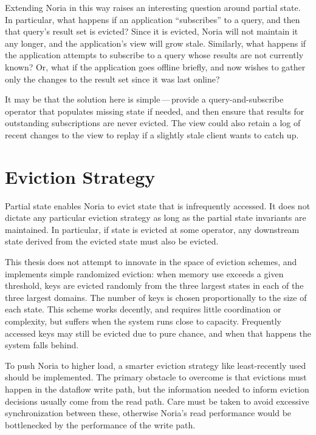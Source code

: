 Extending Noria in this way raises an interesting question around partial state.
In particular, what happens if an application ``subscribes'' to a query, and
then that query's result set is evicted? Since it is evicted, Noria will not
maintain it any longer, and the application's view will grow stale. Similarly,
what happens if the application attempts to subscribe to a query whose results
are not currently known? Or, what if the application goes offline briefly, and
now wishes to gather only the changes to the result set since it was last
online?

It may be that the solution here is simple\,---\,provide a query-and-subscribe
operator that populates missing state if needed, and then ensure that results
for outstanding subscriptions are never evicted. The view could also retain a
log of recent changes to the view to replay if a slightly stale client wants to
catch up.

\section{Eviction Strategy}

Partial state enables Noria to evict state that is infrequently accessed. It
does not dictate any particular eviction strategy as long as the partial state
invariants are maintained. In particular, if state is evicted at some operator,
any downstream state derived from the evicted state must also be evicted.

This thesis does not attempt to innovate in the space of eviction schemes, and
implements simple randomized eviction: when memory use exceeds a given
threshold, keys are evicted randomly from the three largest states in each of
the three largest domains. The number of keys is chosen proportionally to the
size of each state. This scheme works decently, and requires little coordination
or complexity, but suffers when the system runs close to capacity. Frequently
accessed keys may still be evicted due to pure chance, and when that happens the
system falls behind.

To push Noria to higher load, a smarter eviction strategy like least-recently
used should be implemented. The primary obstacle to overcome is that evictions
must happen in the dataflow write path, but the information needed to inform
eviction decisions usually come from the read path. Care must be taken to avoid
excessive synchronization between these, otherwise Noria's read performance
would be bottlenecked by the performance of the write path.

